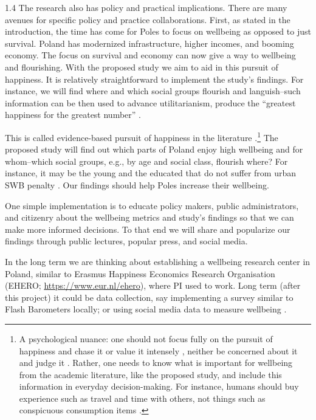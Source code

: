 \documentclass[10pt, letterpaper]{article}
\begin{document}
\begin{spacing}{1.4}
The research also has policy and practical implications. There are many avenues
for specific policy and practice collaborations. First, as stated in the
introduction, the time has come for Poles to focus on wellbeing as opposed to
just survival. Poland has modernized infrastructure, higher incomes, and booming economy. The %
focus on survival and economy
 can now give a way to 
 wellbeing and flourishing.
 With the proposed study we aim to aid in this pursuit of happiness.
It is relatively straightforward to implement the study's findings. For instance,
  we will find where and which social groups flourish and languish--such
  information can be then used to advance utilitarianism, produce the ``greatest happiness for the
  greatest number'' \citep{nussbaum12,kahneman97ws,diener09}.
 
 This is called evidence-based pursuit of happiness in the literature \citep{veenhoven12}.\footnote{A
  psychological nuance: one should not focus fully on the pursuit of
  happiness and chase it or value it intensely
  \citep{mauss11,gruber11}, neither be concerned about it and judge it
  \citep{zerwas24}.%
  Rather, one needs to know what is important
for wellbeing from the academic literature, like the proposed study, and include
this information in everyday decision-making. For instance, humans should
 buy experience such as travel and time with others, not things such
as conspicuous consumption items \citep{aok_ls_car15,veblen05a,veblen05b,thoreau95}.}
 The proposed study will find out which parts of Poland enjoy high wellbeing and for
 whom--which social groups, e.g., by age and social class, flourish where? For
 instance, it may be the young and the educated that do not suffer from urban SWB
 penalty \citep{aok14}.   
 Our findings should help Poles increase their wellbeing.


{One simple implementation is  to educate policy
 makers, public administrators, and citizenry about the wellbeing metrics and
 study's findings so that we can make more informed decisions. 
 To that end we will share and popularize our findings through public lectures, 
 popular press, and social media.

  In the long term we are thinking about
  establishing a wellbeing research center in Poland, similar to Erasmus
  Happiness Economics Research Organisation (EHERO; \url{https://www.eur.nl/ehero}), where PI used to work. 
   Long term (after this project) it could be data
  collection, say implementing a survey similar to Flash Barometers locally; or
  using social media data to measure wellbeing \citep{iacus25b}.
  
}
\end{spacing}
\end{document}
